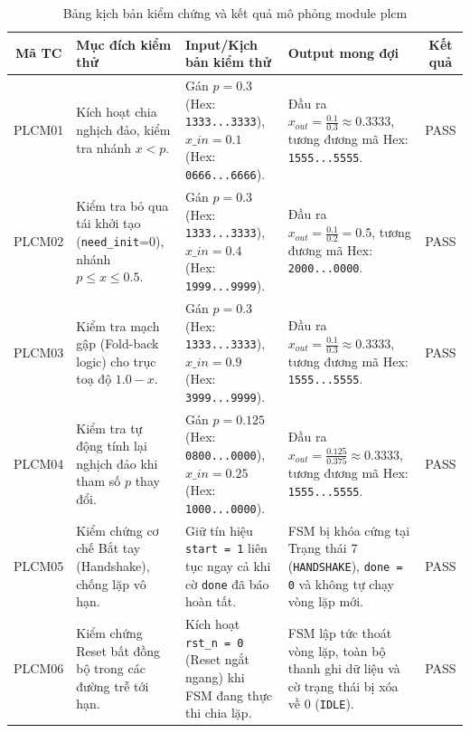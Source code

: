 \begin{table}[H]
	\centering
	\caption{Bảng kịch bản kiểm chứng và kết quả mô phỏng module plcm}
	\label{bang_testcase_plcm_tonghop}
	\renewcommand{\arraystretch}{1.4}
	\begin{tabular}{|c|p{3.2cm}|p{3.6cm}|p{4.2cm}|c|}
		\hline
		\textbf{Mã TC} & \textbf{Mục đích kiểm thử} & \textbf{Input/Kịch bản kiểm thử} & \textbf{Output mong đợi} & \textbf{Kết quả} \\ \hline
		
		PLCM01 & Kích hoạt chia nghịch đảo, kiểm tra nhánh $x < p$. & Gán $p = 0.3$ (Hex: \texttt{1333...3333}), \newline $x\_in = 0.1$ (Hex: \texttt{0666...6666}). & Đầu ra $x_{out} = \frac{0.1}{0.3} \approx 0.3333$, tương đương mã Hex: \texttt{1555...5555}. & PASS \\ \hline
		
		PLCM02 & Kiểm tra bỏ qua tái khởi tạo (\texttt{need\_init}=0), nhánh $p \le x \le 0.5$. & Gán $p = 0.3$ (Hex: \texttt{1333...3333}), \newline $x\_in = 0.4$ (Hex: \texttt{1999...9999}). & Đầu ra $x_{out} = \frac{0.1}{0.2} = 0.5$, tương đương mã Hex: \texttt{2000...0000}. & PASS \\ \hline
		
		PLCM03 & Kiểm tra mạch gập (Fold-back logic) cho trục toạ độ $1.0 - x$. & Gán $p = 0.3$ (Hex: \texttt{1333...3333}), \newline $x\_in = 0.9$ (Hex: \texttt{3999...9999}). & Đầu ra $x_{out} = \frac{0.1}{0.3} \approx 0.3333$, tương đương mã Hex: \texttt{1555...5555}. & PASS \\ \hline
		
		PLCM04 & Kiểm tra tự động tính lại nghịch đảo khi tham số $p$ thay đổi. & Gán $p = 0.125$ (Hex: \texttt{0800...0000}), \newline $x\_in = 0.25$ (Hex: \texttt{1000...0000}). & Đầu ra $x_{out} = \frac{0.125}{0.375} \approx 0.3333$, tương đương mã Hex: \texttt{1555...5555}. & PASS \\ \hline
		
		PLCM05 & Kiểm chứng cơ chế Bắt tay (Handshake), chống lặp vô hạn. & Giữ tín hiệu \texttt{start = 1} liên tục ngay cả khi cờ \texttt{done} đã báo hoàn tất. & FSM bị khóa cứng tại Trạng thái 7 (\texttt{HANDSHAKE}), \texttt{done = 0} và không tự chạy vòng lặp mới. & PASS \\ \hline
		
		PLCM06 & Kiểm chứng Reset bất đồng bộ trong các đường trễ tới hạn. & Kích hoạt \texttt{rst\_n = 0} (Reset ngắt ngang) khi FSM đang thực thi chia lặp. & FSM lập tức thoát vòng lặp, toàn bộ thanh ghi dữ liệu và cờ trạng thái bị xóa về 0 (\texttt{IDLE}). & PASS \\ \hline
	\end{tabular}
\end{table}

